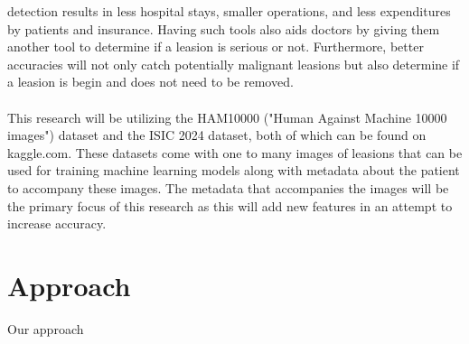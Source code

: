 \documentclass[10pt,twocolumn,letterpaper]{article}
\begin{document}
    detection results in less hospital stays, smaller operations, and less
    expenditures by patients and insurance.  Having such tools also aids
    doctors by giving them another tool to determine if a leasion is serious
    or not.  Furthermore, better accuracies will not only catch potentially malignant
    leasions but also determine if a leasion is begin and does not need to
    be removed. \\
    \\
    This research will be utilizing the HAM10000 ("Human Against Machine 10000 images")
    dataset and the ISIC 2024 dataset, both of which can be found on kaggle.com.  These datasets come with one to many images
    of leasions that can be used for training machine learning models along with
    metadata about the patient to accompany these images.  The metadata that accompanies
    the images will be the primary focus of this research as this will add new features
    in an attempt to increase accuracy. \\
    
    \section{Approach}
    Our approach

    {\small
        
        
    }
\end{document}
